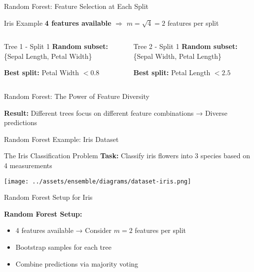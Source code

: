\documentclass[10pt]{beamer}
\newcommand{\fitpic}[1]{\begin{adjustbox}{max width=\linewidth, max totalheight=0.78\textheight}#1\end{adjustbox}}
\begin{document}
\begin{frame}{Random Forest: Feature Selection at Each Split}
\begin{examplebox}{Iris Example}
\textbf{4 features available} $\Rightarrow$ $m = \sqrt{4} = 2$ features per split
\end{examplebox}

\begin{columns}
\begin{column}{0.48\textwidth}
\begin{definitionbox}{Tree 1 - Split 1}
\textbf{Random subset:} \{Sepal Length, Petal Width\}

\textbf{Best split:} Petal Width $< 0.8$
\end{definitionbox}
\end{column}

\begin{column}{0.48\textwidth}
\begin{definitionbox}{Tree 2 - Split 1}
\textbf{Random subset:} \{Sepal Width, Petal Length\}

\textbf{Best split:} Petal Length $< 2.5$
\end{definitionbox}
\end{column}
\end{columns}
\end{frame}

\begin{frame}{Random Forest: The Power of Feature Diversity}
\begin{keypointsbox}
\textbf{Result:} Different trees focus on different feature combinations → Diverse predictions
\end{keypointsbox}
\end{frame}

\begin{frame}{Random Forest Example: Iris Dataset}
\begin{examplebox}{The Iris Classification Problem}
\textbf{Task:} Classify iris flowers into 3 species based on 4 measurements
\end{examplebox}

  \vspace{0.3cm}
  \centering
  \fitpic{\texttt{[image: ../assets/ensemble/diagrams/dataset-iris.png]}}
\end{frame}

\begin{frame}{Random Forest Setup for Iris}
\begin{keypointsbox}
\textbf{Random Forest Setup:}
\begin{itemize}
\item 4 features available → Consider $m = 2$ features per split
\item Bootstrap samples for each tree
\item Combine predictions via majority voting
\end{itemize}
\end{keypointsbox}
\end{frame}
\end{document}
